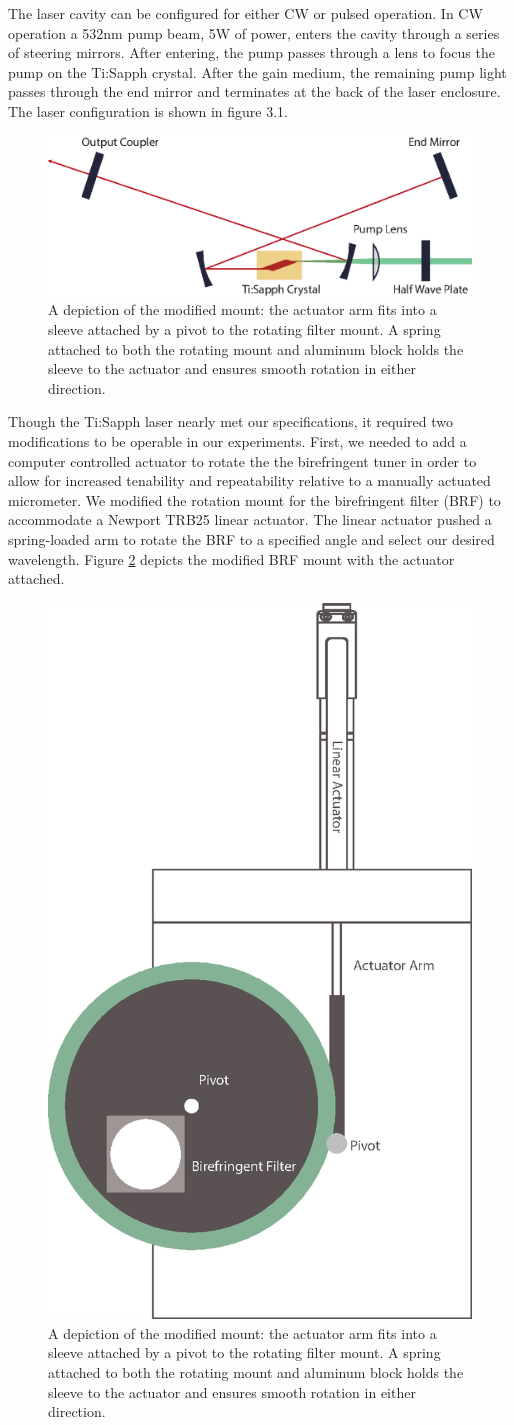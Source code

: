 \indent The laser cavity can be configured for either CW or pulsed operation. In CW operation a 532nm pump beam, 5W of power, enters the cavity through a series of steering mirrors. After entering, the pump passes through a lens to focus the pump on the Ti:Sapph crystal. After the gain medium, the remaining pump light passes through the end mirror and terminates at the back of the laser enclosure. The laser configuration is shown in figure 3.1.
\begin{figure}[h!]
\centering
\includegraphics[width = .8\textwidth]{laser.eps}
\caption{ \doublespacing A depiction of the modified mount: the actuator arm fits into a sleeve attached by a pivot to the rotating filter mount. A spring attached to both the rotating mount and aluminum block holds the sleeve to the actuator and ensures smooth rotation in either direction.}
\label{lasercav}
\end{figure}

\indent Though the Ti:Sapph laser nearly met our specifications, it required two modifications to be operable in our experiments. First, we needed to add a computer controlled actuator to rotate the the birefringent tuner in order to allow for increased tenability and repeatability relative to a manually actuated micrometer. We modified the rotation mount for the birefringent filter (BRF) to accommodate a Newport TRB25 linear actuator. The linear actuator pushed a spring-loaded arm to rotate the BRF to a specified angle and select our desired wavelength. Figure \ref{brfmount} depicts the modified BRF mount with the actuator attached.
\begin{figure}[h!]
\centering
\includegraphics[width = .35\textwidth]{Actuator.eps}
\caption{ \doublespacing A depiction of the modified mount: the actuator arm fits into a sleeve attached by a pivot to the rotating filter mount. A spring attached to both the rotating mount and aluminum block holds the sleeve to the actuator and ensures smooth rotation in either direction.}
\label{brfmount}
\end{figure}

